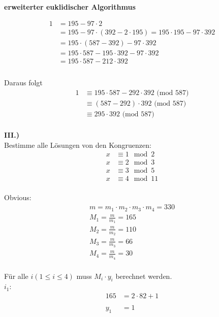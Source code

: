 \documentclass[12pt]{scrartcl}
\begin{document}
\textbf{erweiterter euklidischer Algorithmus}

\begin{align*}
    1 &= 195 - 97 \cdot 2 \\
    &= 195 - 97 \cdot (392 - 2 \cdot 195) = 195 \cdot 195 -  97 \cdot 392\\
    &= 195 \cdot (587 - 392) - 97 \cdot 392\\
    &= 195 \cdot 587 - 195 \cdot 392 - 97 \cdot 392\\
    &= 195 \cdot 587 - 212 \cdot 392\\
\end{align*}\\

\newpage
Daraus folgt
\begin{align*}
    1 &\equiv 195 \cdot 587 - 292 \cdot 392 \text{ (mod } 587) \\
      &\equiv (587 - 292) \cdot 392 \text{ (mod } 587) \\
      &\equiv 295 \cdot 392 \text{ (mod } 587) \\
\end{align*}


\textbf{III.)}\\
Bestimme alle Lösungen von den Kongruenzen:
\begin{align*}
    x  &\equiv 1 \mod 2 \\
    x  &\equiv 2 \mod 3 \\
    x  &\equiv 3 \mod 5 \\
    x  &\equiv 4 \mod 11 \\
\end{align*}

Obvious:
\begin{align*}
    m = m_1 \cdot m_2 \cdot m_3 \cdot m_4 = 330 \\
    M_1 = \frac{m}{m_1} = 165 \\
    M_2 = \frac{m}{m_2} = 110 \\
    M_3 = \frac{m}{m_3} = 66 \\
    M_4 = \frac{m}{m_4} = 30 \\
\end{align*}

\newpage
Für alle $i(1 \leq i \leq 4)$ muss $M_i \cdot y_i$ berechnet werden.\\

$i_1$:\\
\begin{align*}
    165 &= 2 \cdot 82 + 1\\
    \\
    y_1 &= 1\\
\end{align*}
\end{document}
